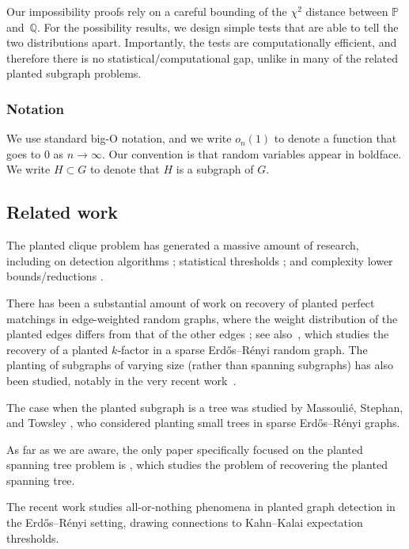 \documentclass[11pt]{article}
\newcommand{\bbP}{\mathbb{P}}
\newcommand{\bbQ}{\mathbb{Q}}
\numberwithin{equation}{section}
\numberwithin{thm}{section}
\begin{document}
Our impossibility proofs rely on a careful bounding of the $\chi^2$ distance between $\bbP$ and~$\bbQ$. For the possibility results, we design simple tests that are able to tell the two distributions apart. Importantly, the tests are computationally efficient, and therefore there is no statistical/computational gap, unlike in many of the related planted subgraph problems.


\subsubsection*{Notation}
We use standard big-O notation, and we  write $o_n(1)$ to denote a function that goes to $0$ as $n \to \infty$.
Our convention is that random variables appear in boldface. 
We write $H \subset G$ to denote that $H$ is a subgraph of $G$.


\subsection{Related work}
\label{sec:literature}

The planted clique problem  \cite{MR1179827,MR1327775} has generated a massive amount of research, including on detection algorithms \cite{MR1662795,MR2735341,DeGuPe11,DeMo15}; 
statistical thresholds \cite{MR3664576,MR3670183,MR4751648,MR4441142}; and complexity lower bounds/reductions  \cite{brennan2018reducibility,brennan2020reducibility,MR4764820, MR4617369,MR2402475}.

There has been a substantial amount of work on recovery of planted perfect matchings in edge-weighted random graphs, 
where the weight distribution of the planted edges differs from that of the other edges \cite{MR4147946,MR4350971,MR4634336}; see also~\cite{pmlr-v291-gaudio25a}, which studies the recovery of a planted $k$-factor in a sparse Erd\H{o}s--R\'enyi random graph. The planting of subgraphs of varying size (rather than spanning subgraphs) has also been studied, notably in the very recent work~\cite{elimelech2025detecting}. 

The case when the planted subgraph is a tree was studied by Massouli{\'e}, Stephan, and Towsley \cite{MaStTo19}, who considered planting small trees in sparse Erd\H{o}s--Rényi graphs.


As far as we are aware, the only paper specifically focused on the planted spanning tree problem is  \cite{moharrami2025planted}, which studies the problem of recovering the planted spanning tree. 

The recent work \cite{MR4871715} studies all-or-nothing phenomena in planted graph detection in the Erd\H{o}s--R\'enyi setting, drawing connections to  Kahn--Kalai expectation thresholds.
\end{document}
